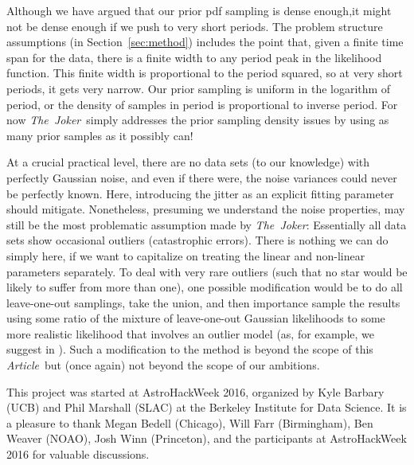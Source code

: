 \documentclass[manuscript, letterpaper]{aastex6}
\newcommand{\project}[1]{\textsl{#1}}
\newcommand{\samplername}{\project{The~Joker}}
\newcommand{\documentname}{\textsl{Article}}
\newcommand{\sectionname}{Section}
\begin{document}
Although we have argued that our prior pdf sampling is dense enough,it might not
be dense enough if we push to very short periods.
The problem structure assumptions (in \sectionname~\ref{sec:method})
includes the point that, given a finite time span for the data, there
is a finite width to any period peak in the likelihood function.
This finite width is proportional to the period squared, so at very short
periods, it gets very narrow.
Our prior sampling is uniform in the logarithm of period, or the
density of samples in period is proportional to inverse period.
For now \samplername\ simply addresses the prior sampling density issues
by using as many prior samples as it possibly can!


At a crucial practical level, there are no data sets (to our knowledge) with
perfectly Gaussian noise, and even if there were, the noise variances
could never be perfectly known. Here, introducing the jitter as an explicit fitting parameter
should mitigate. Nonetheless, presuming we understand the noise properties,
may still be the most problematic  assumption made by
\samplername :
Essentially all data sets show occasional outliers (catastrophic errors).
There is nothing we can do simply here, if we want to capitalize on treating the
linear and non-linear parameters separately.
To deal with very rare outliers (such that no star would be likely to suffer
from more than one), one possible modification would be to do all leave-one-out
samplings, take the union, and then importance sample the results using some
ratio of the mixture of leave-one-out Gaussian likelihoods to some more
realistic likelihood that involves an outlier model (as, for example, we suggest
in \citealt{Hogg:2010a}).
Such a modification to the method is beyond the scope of this
\documentname\, but (once again) not beyond the scope of our ambitions.

\acknowledgements
This project was started at AstroHackWeek 2016, organized by Kyle
Barbary (UCB) and Phil Marshall (SLAC) at the Berkeley Institute for
Data Science.
It is a pleasure to thank
  Megan Bedell (Chicago),
  Will Farr (Birmingham),
  Ben Weaver (NOAO),
  Josh Winn (Princeton),
  and the participants at AstroHackWeek 2016
for valuable discussions.
\end{document}

